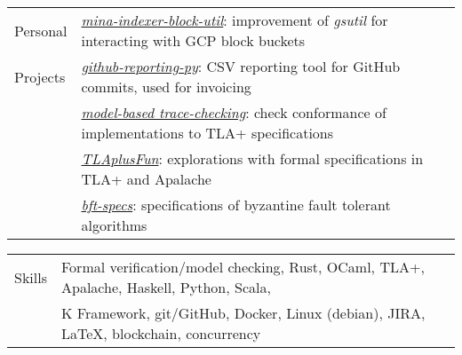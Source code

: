 \documentclass[letterpaper,10pt,oneside]{article}
\begin{document}
\vfill

\newpage


\noindent \begin{tabular}{@{} l l}
 \Large{Personal} & \href{https://github.com/Isaac-DeFrain/fn/tree/main/mina-indexer-block-util}{\emph{mina-indexer-block-util}}: improvement of \emph{gsutil} for interacting with GCP block buckets \\
 \Large{Projects} & \href{https://github.com/Isaac-DeFrain/github-reporting-py}{\emph{github-reporting-py}}: CSV reporting tool for GitHub commits, used for invoicing \\
 \hspace{1.1in} & \href{https://github.com/Isaac-DeFrain/model-based-trace-checking}{\emph{model-based trace-checking}}: check conformance of implementations to TLA+ specifications \\
 & \href{https://github.com/Isaac-DeFrain/TLAplusFun}{\emph{TLAplusFun}}: explorations with formal specifications in TLA+ and Apalache \\
 & \href{https://github.com/Isaac-DeFrain/bft-specs}{\emph{bft-specs}}: specifications of byzantine fault tolerant algorithms \\
\end{tabular}

\vfill


\noindent \begin{tabular}{@{} l l}
 \Large{Skills} & Formal verification/model checking, Rust, OCaml, TLA+, Apalache, Haskell, Python, Scala, \\
 \hspace{1.1in} & K Framework, git/GitHub, Docker, Linux (debian), JIRA, \LaTeX, blockchain, concurrency \\
\end{tabular}
\end{document}

